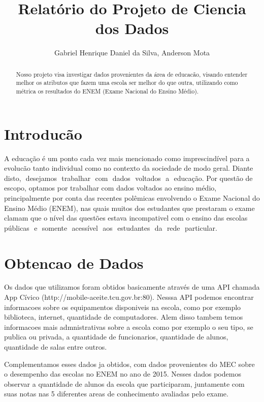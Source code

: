\documentclass[review]{elsarticle}
\begin{document}
\begin{frontmatter}

\title{Relatório do Projeto de Ciencia dos Dados}

\author{Gabriel Henrique Daniel da Silva, Anderson Mota}
\address{Recife, Pernambuco}

\begin{abstract}
Nosso projeto visa investigar dados provenientes da área de educacão, visando entender melhor os atributos que fazem uma escola ser melhor do que outra, utilizando como métrica os resultados do ENEM (Exame Nacional do Ensino Médio).
\end{abstract}

\end{frontmatter}

\linenumbers

\section{Introducão}

A educação é um ponto cada vez mais mencionado como imprescindível
para a evolucão tanto individual como no contexto da sociedade de modo geral.
Diante​ ​ disto,​ ​ desejamos​ ​ trabalhar​ ​ com​ ​ dados​ ​ voltados​ ​ a ​ ​ educação.
Por questão de escopo, optamos por trabalhar com dados voltados ao ensino
médio, principalmente por conta das recentes polêmicas envolvendo o Exame
Nacional do Ensino Médio (ENEM), nas quais muitos dos estudantes que prestaram
o exame clamam que o nível das questões estava incompativel com o ensino das
escolas​ ​ públicas​ ​ e ​ ​ somente​ ​ acessível​ ​ aos​ ​ estudantes​ ​ da​ ​ rede​ ​ particular.

\section{Obtencao de Dados}
Os dados que utilizamos foram obtidos basicamente através de uma API chamada App Cívico (http://mobile-aceite.tcu.gov.br:80). Nesssa API podemos encontrar informacoes sobre os equipamentos disponiveis na escola, como por exemplo biblioteca, internet, quantidade de computadores. Alem disso tambem temos informacoes mais admnistrativas sobre a escola como por exemplo o seu tipo, se publica ou privada, a quantidade de funcionarios, quantidade de alunos, quantidade de salas entre outros.

Complementamos esses dados ja obtidos, com dados provenientes do MEC sobre o desempenho das escolas no ENEM no ano de 2015. Nesses dados podemos observar a quantidade de alunos da escola que participaram, juntamente com suas notas nas 5 diferentes areas de conhecimento avaliadas pelo exame.
\end{document}
